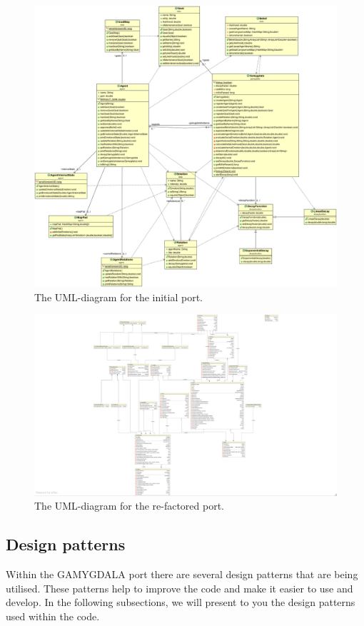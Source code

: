 \begin{figure}
\includegraphics[width=\linewidth]{GAMYGDALA_UML_OLD}
\caption{The UML-diagram for the initial port.}
\end{figure}

\pagebreak

\begin{figure}
\includegraphics[width=\linewidth]{diagram-gamygdala}
\caption{The UML-diagram for the re-factored port.}
\end{figure}

\pagebreak

\subsection{Design patterns}
Within the GAMYGDALA port there are several design patterns that are being utilised. These patterns help to improve the code and make it easier to use and develop. In the following subsections, we will present to you the design patterns used within the code.

